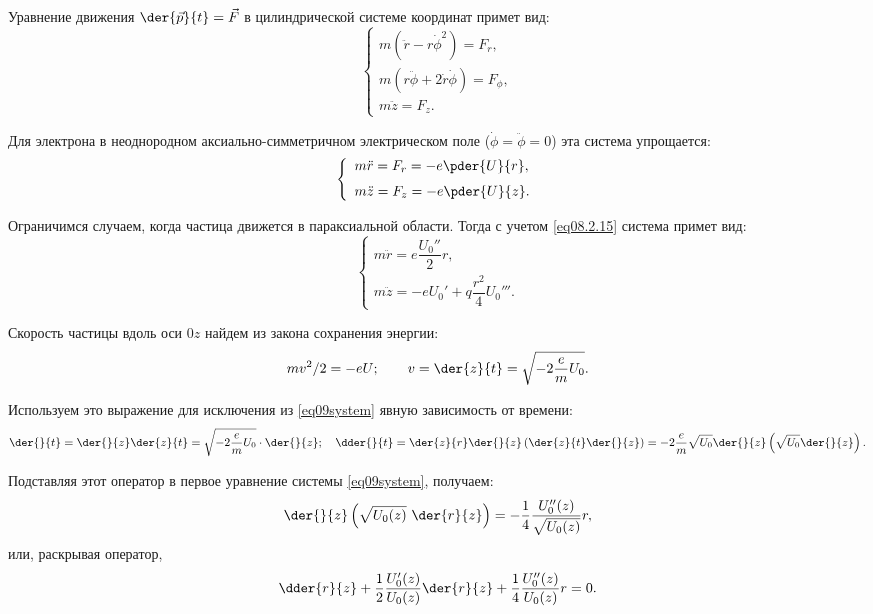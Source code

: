 
Уравнение движения
\( \displaystyle
  \der{\vec{p}}{t} = \vec{F}
\)
в цилиндрической системе координат примет вид:
\[
  \left\{
    \begin{array}{l}
      m(\ddot{r} - r\dot{\phi}^2) = F_r, \\
      m(r\ddot{\phi} + 2\dot{r}\dot{\phi}) = F_\phi, \\
      m\ddot{z} = F_z.
    \end{array}
  \right.
\]

Для электрона в неоднородном аксиально-симметричном электрическом поле
(\( \dot{\phi} = \ddot{\phi} = 0 \)) эта система упрощается:
\[
  \left\{
    \begin{array}{l}
      \displaystyle m\ddot{r} = F_r = -e\pder{U}{r}, \\[.6em]
      \displaystyle m\ddot{z} = F_z = -e\pder{U}{z}.
    \end{array}
  \right.
\]

Ограничимся случаем, когда частица движется в параксиальной области. Тогда с
учетом \eqref{eq08.2.15} система примет вид:
\begin{equation}
  \left\{
    \begin{array}{l}
      m\ddot{r} = e\dfrac{U_0''}{2}r, \\
      m\ddot{z} = -eU_0' + q\dfrac{r^2}{4}U_0'''.
    \end{array}
  \right.
  \label{eq09system}
\end{equation}

Скорость частицы вдоль оси \( 0z \) найдем из закона сохранения энергии:
\[
  mv^2 / 2 = -eU; \qquad
    v = \der{z}{t} = \sqrt{-2\frac{e}{m}U_0}.
\]

Используем это выражение для исключения из \eqref{eq09system} явную зависимость
от времени:
\[
  \der{}{t} = \der{}{z}\der{z}{t} = \sqrt{-2\frac{e}{m}U_0}\cdot\der{}{z}; \quad
    \dder{}{t} = \der{z}{r}\der{}{z} \left( \der{z}{t}\der{}{z} \right) =
    -2\frac{e}{m}\sqrt{U_0}\der{}{z} \left( \sqrt{U_0}\der{}{z} \right).
\]

Подставляя этот оператор в первое уравнение системы \eqref{eq09system},
получаем:
\begin{equation}
  \der{}{z} \left( \sqrt{U_0(z)}\ \der{r}{z} \right) = -\frac{1}{4}
    \frac{U_0''(z)}{\sqrt{U_0(z)}} r,
  \label{eq09equation}
\end{equation}
или, раскрывая оператор,
\begin{equation}
  \dder{r}{z} + \frac{1}{2} \frac{U_0'(z)}{U_0(z)} \der{r}{z} + \frac{1}{4}
    \frac{U_0''(z)}{U_0(z)} r = 0.
  \label{eq09paraxial}
\end{equation}

